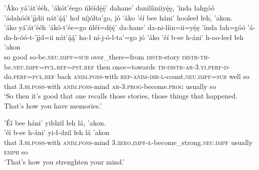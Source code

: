 \ea\label{ex:text6-16-39}
’Áko yá’át’ééh, ’ákót’éego ńléídę́ę́’ dahane’ danilíiniiyę́ę, ’índa łahgóó ’ádahóót’įįdii nát’ą́ą́’ hoł níjólta’go, jó ’áko ’éí bee háni’ hooleeł łeh, ’akon.\\
\gll ’áko	yá’át’ééh	’ákó-t’ée=go	ńléí=dę́ę́’	da-hane’	da-ni-líin=ii=yę́ę	’índa	łah=góó	’á-da-h-óó-t-’įįd=ii	nát’ą́ą́’	ha-ł	ní-j-ó-l-ta’=go	jó	’áko	’éí	b-ee	h-áni’	h-oo-leeł	łeh	’akon\\
     so	good	so-be.\textsc{neu}.\textsc{impf}=\textsc{sub}	over\_there=from	\textsc{distr}-story	\textsc{distr}-\textsc{th}-be.\textsc{neu}.\textsc{impf}=\textsc{pcl}.\textsc{ref}=\textsc{pst}.\textsc{ref}	then	once=towards	\textsc{th}-\textsc{distr}-\textsc{ar}-3.\textsc{yi}.\textsc{perf}-\textsc{d}-do.\textsc{perf}=\textsc{pcl}.\textsc{ref}	back	\textsc{anim}.\textsc{poss}-with	\textsc{rep}-\textsc{anim}-\textsc{dir}-\textsc{l}-count.\textsc{neu}.\textsc{impf}=\textsc{sub}	well	so	that	3.\textsc{bi}.\textsc{poss}-with	\textsc{anim}.\textsc{poss}-mind	\textsc{ar}-3.\textsc{prog}-become.\textsc{prog}	usually	so\\
\glt `So then it’s good that one recalls those stories, those things that happened. That’s how you have memories.'
\z

\ea\label{ex:text6-16-40}
’Éí bee háni’ yiłdzil łeh lá, ’akon.\\
\gll ’éí	b-ee	h-áni’	yi-ł-dzil	łeh	lá	’akon\\
     that	3.\textsc{bi}.\textsc{poss}-with	\textsc{anim}.\textsc{poss}-mind	3.\textsc{zero}.\textsc{impf}-\textsc{ł}-become\_strong.\textsc{neu}.\textsc{impf}	usually	\textsc{emph}	so\\
\glt `That’s how you strenghten your mind.'
\z
